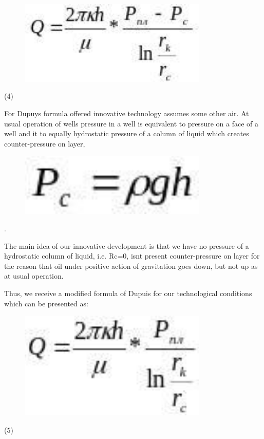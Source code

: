 \begin{figure}[H]
	\centering
	\includegraphics[width=0.8\textwidth]{assets/1345}
	\caption*{}
\end{figure} (4)

For Dupuy\textquotesingle s formula offered innovative technology
assumes some other air. At usual operation of wells pressure in a well
is equivalent to pressure on a face of a well and it to equally
hydrostatic pressure of a column of liquid which creates
counter-pressure on layer, \begin{figure}[H]
	\centering
	\includegraphics[width=0.8\textwidth]{assets/1346}
	\caption*{}
\end{figure}.

The main idea of our innovative development is that we have no pressure
of a hydrostatic column of liquid, i.e. Rc=0, isn\textquotesingle t
present counter-pressure on layer for the reason that oil under positive
action of gravitation goes down, but not up as at usual operation.

Thus, we receive a modified formula of Dupuis for our technological
conditions which can be presented as:

\begin{figure}[H]
	\centering
	\includegraphics[width=0.8\textwidth]{assets/1347}
	\caption*{}
\end{figure} (5)

